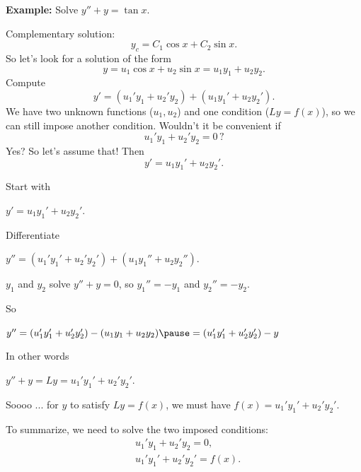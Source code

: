 \documentclass[10pt,aspectratio=169]{beamer}
\begin{document}
\begin{frame}
\textbf{Example:}
Solve $y''+y=\tan x$.

\medskip
\pause

Complementary solution:
\[
y_c = C_1 \cos x + C_2 \sin x .
\]
\pause
So let's look for a solution of the form
\[
y = u_1 \cos x + u_2 \sin x = u_1 y_1 + u_2 y_2 .
\]
\pause
Compute
\[
y' = (u_1' y_1 + u_2' y_2) + (u_1 y_1' + u_2 y_2').
\]
\pause
We have two unknown functions ($u_1,u_2$) and one condition ($Ly=f(x)$),
so we can still impose another condition.
\pause
Wouldn't it be convenient if
\[
u_1' y_1 + u_2' y_2 = 0 \, ?
\]
\pause
Yes?  So let's assume that!
\pause
Then
\[
y' = u_1 y_1' + u_2 y_2' .
\]

\end{frame}

\begin{frame}
Start with

\quad
$y' = u_1 y_1' + u_2 y_2'$.

\medskip
\pause

Differentiate

\quad
$y'' = (u_1' y_1' + u_2' y_2') + (u_1 y_1'' + u_2 y_2'')$.

\medskip
\pause

$y_1$ and $y_2$ solve $y''+y = 0$, so $y_1'' = - y_1$ and $y_2'' = - y_2$.

\medskip
\pause

So

\quad
$y'' =
(u_1' y_1' + u_2' y_2') - (u_1 y_1 + u_2 y_2) 
\pause
=
(u_1' y_1' + u_2' y_2') - y
$

\medskip
\pause

In other words

\quad
$y'' + y = Ly = u_1' y_1' + u_2' y_2'$.

\medskip

\pause
Soooo ...  for $y$ to satisfy $Ly = f(x)$, we must have
$f(x) = u_1' y_1' + u_2' y_2'$.

\medskip
\pause

To summarize, we need to solve the two imposed conditions:
\[
\boxed{~~
\begin{aligned}
& u_1' y_1 + u_2' y_2 = 0 ,\\
& u_1' y_1' + u_2' y_2' = f(x) .
\end{aligned}
~~}
\]

\end{frame}
\end{document}
